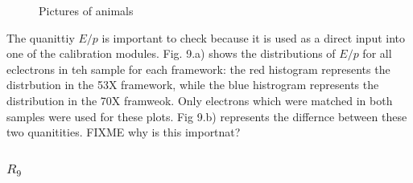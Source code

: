 \documentclass[10pt]{article}
\begin{document}
\begin{figure}[h!]
        \caption{Pictures of animals}\label{fig:animals}
\end{figure}

The quanittiy $E/p$ is important to check because it is used as a direct input into one of the calibration modules. Fig. 9.a) shows the distributions of $E/p$ for all eclectrons in teh sample for each framework: the red histogram represents the distrbution in the 53X framework, while the blue histrogram represents the distribution in the 70X framweok. Only electrons which were matched in both samples were used for these plots. Fig 9.b) represents the differnce between these two quanitities. FIXME why is this importnat?



\subsubsection{$R_9$}
\end{document}
